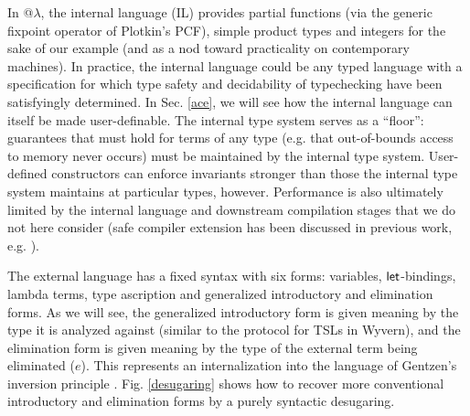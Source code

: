In @$\lambda$, the internal language (IL) provides partial functions (via the generic fixpoint operator of Plotkin's PCF), simple product  types and integers for the sake of our example (and as a nod toward practicality on contemporary machines). In practice, the internal language could be any typed  language with a specification for which type safety and decidability of typechecking have been satisfyingly determined. In Sec. \ref{ace}, we will see how the internal language can itself be made user-definable. The internal type system serves as a ``floor'': guarantees that must hold for terms of any type (e.g. that out-of-bounds access to memory never occurs) must be maintained by the internal type system. User-defined constructors can enforce invariants stronger than those the internal type system maintains at particular types, however. Performance is also ultimately limited by the internal language and downstream compilation stages that we do not here consider (safe compiler extension has been discussed in previous work, e.g. \cite{conf/pldi/TatlockL10}).

The external language has a fixed syntax with six forms: variables, ${\sf let}$-bindings, lambda terms, type ascription and generalized introductory and elimination forms. As we will see, the generalized introductory form is given meaning by the type it is analyzed against (similar to the protocol for TSLs in Wyvern), and the elimination form is given meaning by the type of the external term being eliminated ($e$). This represents an internalization into the language of Gentzen's inversion principle \cite{gentzen}. Fig. \ref{desugaring} shows how to recover more conventional introductory and elimination forms by a purely syntactic desugaring.%

